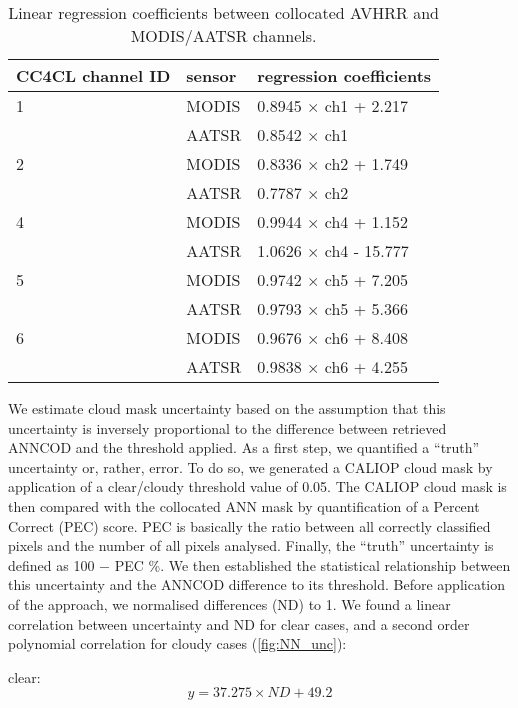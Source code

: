 \begin{table}[h]
  \caption{Linear regression coefficients between collocated AVHRR and MODIS/AATSR channels.}
  \begin{tabular}{l|l|l} %
    \hline
    CC4CL channel ID & sensor & regression coefficients \\    
    \hline
    1 & MODIS & 0.8945 $\times$ ch1 + 2.217 \\
      & AATSR & 0.8542 $\times$ ch1 \\ \hline
    2 & MODIS & 0.8336 $\times$ ch2 + 1.749 \\
      & AATSR & 0.7787 $\times$ ch2 \\ \hline
    4 & MODIS & 0.9944 $\times$ ch4 + 1.152 \\
      & AATSR & 1.0626 $\times$ ch4 - 15.777 \\ \hline
    5 & MODIS & 0.9742 $\times$ ch5 + 7.205 \\
      & AATSR & 0.9793 $\times$ ch5 + 5.366 \\ \hline
    6 & MODIS & 0.9676 $\times$ ch6 + 8.408 \\
      & AATSR & 0.9838 $\times$ ch6 + 4.255 \\
    \hline
  \end{tabular}
  \label{tab:ANN_coefficients}
\end{table}

We estimate cloud mask uncertainty based on the assumption that this uncertainty is inversely proportional to the difference between retrieved ANNCOD and the threshold applied. As a first step, we quantified a ``truth'' uncertainty or, rather, error. To do so, we generated a CALIOP cloud mask by application of a clear/cloudy threshold value of 0.05. The CALIOP cloud mask is then compared with the collocated ANN mask by quantification of a Percent Correct (PEC) score. PEC is basically the ratio between all correctly classified pixels and the number of all pixels analysed. Finally, the ``truth'' uncertainty is defined as 100 $-$ PEC \%. We then established the statistical relationship between this uncertainty and the ANNCOD difference to its threshold. Before application of the approach, we normalised differences (ND) to 1. We found a linear correlation between uncertainty and ND for clear cases, and a second order polynomial correlation for cloudy cases (\autoref{fig:NN_unc}):

clear:
\begin{equation}
  y = 37.275 \times ND + 49.2
\end{equation}

